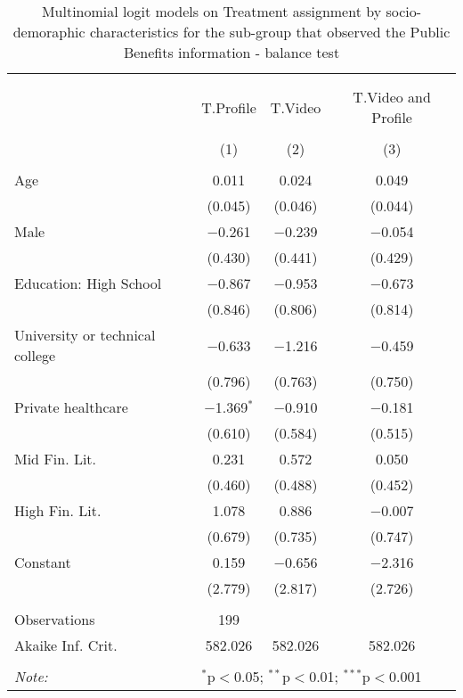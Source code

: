 
\begin{table}[H] \centering 
  \caption{Multinomial logit models on Treatment assignment by socio-demoraphic characteristics for the sub-group that observed the Public Benefits information - balance test} 
  \label{tbl:balance_public_online} 
\begin{tabular}{@{\extracolsep{5pt}}lccc} 
\\[-1.8ex]\hline 
\hline \\[-1.8ex] 
\\[-1.8ex] & T.Profile & T.Video & T.Video and Profile \\ 
\\[-1.8ex] & (1) & (2) & (3)\\ 
\hline \\[-1.8ex] 
 Age & 0.011 & 0.024 & 0.049 \\ 
  & (0.045) & (0.046) & (0.044) \\ 
  Male & $-$0.261 & $-$0.239 & $-$0.054 \\ 
  & (0.430) & (0.441) & (0.429) \\ 
  Education: High School & $-$0.867 & $-$0.953 & $-$0.673 \\ 
  & (0.846) & (0.806) & (0.814) \\ 
  University or technical college & $-$0.633 & $-$1.216 & $-$0.459 \\ 
  & (0.796) & (0.763) & (0.750) \\ 
  Private healthcare & $-$1.369$^{*}$ & $-$0.910 & $-$0.181 \\ 
  & (0.610) & (0.584) & (0.515) \\ 
  Mid Fin. Lit. & 0.231 & 0.572 & 0.050 \\ 
  & (0.460) & (0.488) & (0.452) \\ 
  High Fin. Lit. & 1.078 & 0.886 & $-$0.007 \\ 
  & (0.679) & (0.735) & (0.747) \\ 
  Constant & 0.159 & $-$0.656 & $-$2.316 \\ 
  & (2.779) & (2.817) & (2.726) \\ 
 \hline \\[-1.8ex] 
Observations & 199 &  &  \\ 
Akaike Inf. Crit. & 582.026 & 582.026 & 582.026 \\ 
\hline 
\hline \\[-1.8ex] 
\textit{Note:}  & \multicolumn{3}{l}{$^{*}$p$<$0.05; $^{**}$p$<$0.01; $^{***}$p$<$0.001} \\ 
\end{tabular} 
\end{table} 
